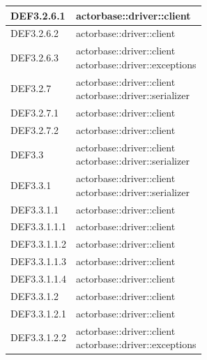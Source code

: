 \documentclass{scalatekids-article}
\begin{document}
\begin{longtable}[H]{|p{3.5cm}|p{7.5cm}|}
\hline
DEF3.2.6.1 & \multiLineCell[t]{actorbase::driver::client\\}\\
\hline
DEF3.2.6.2 & \multiLineCell[t]{actorbase::driver::client\\}\\
\hline
DEF3.2.6.3 & \multiLineCell[t]{actorbase::driver::client\\actorbase::driver::exceptions\\}\\
\hline
DEF3.2.7 & \multiLineCell[t]{actorbase::driver::client\\actorbase::driver::serializer\\}\\
\hline
DEF3.2.7.1 & \multiLineCell[t]{actorbase::driver::client\\}\\
\hline
DEF3.2.7.2 & \multiLineCell[t]{actorbase::driver::client\\}\\
\hline
DEF3.3 & \multiLineCell[t]{actorbase::driver::client\\actorbase::driver::serializer\\}\\
\hline
DEF3.3.1 & \multiLineCell[t]{actorbase::driver::client\\actorbase::driver::serializer\\}\\
\hline
DEF3.3.1.1 & \multiLineCell[t]{actorbase::driver::client\\}\\
\hline
DEF3.3.1.1.1 & \multiLineCell[t]{actorbase::driver::client\\}\\
\hline
DEF3.3.1.1.2 & \multiLineCell[t]{actorbase::driver::client\\}\\
\hline
DEF3.3.1.1.3 & \multiLineCell[t]{actorbase::driver::client\\}\\
\hline
DEF3.3.1.1.4 & \multiLineCell[t]{actorbase::driver::client\\}\\
\hline
DEF3.3.1.2 & \multiLineCell[t]{actorbase::driver::client\\}\\
\hline
DEF3.3.1.2.1 & \multiLineCell[t]{actorbase::driver::client\\}\\
\hline
DEF3.3.1.2.2 & \multiLineCell[t]{actorbase::driver::client\\actorbase::driver::exceptions\\}\\

\end{longtable}
\end{document}

